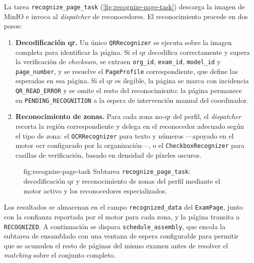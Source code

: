 La tarea \texttt{recognize\_page\_task} (\cref{fig:recognize-page-task})
descarga la imagen de MinIO e invoca al \textit{dispatcher} de
reconocedores. El reconocimiento procede en dos pasos:

\begin{enumerate}
  \item \textbf{Decodificación \acs{qr}.} Un único \texttt{QRRecognizer}
  se ejecuta sobre la imagen completa para identificar la página. Si el
  \acs{qr} decodifica correctamente y supera la verificación de
  \textit{checksum}, se extraen \texttt{org\_id}, \texttt{exam\_id},
  \texttt{model\_id} y \texttt{page\_number}, y se resuelve el
  \texttt{PageProfile} correspondiente, que define las
   esperadas en esa página. Si el \acs{qr} es ilegible, la
  página se marca con incidencia \texttt{QR\_READ\_ERROR} y se omite el
  resto del reconocimiento: la página permanece en
  \texttt{PENDING\_RECOGNITION} a la espera de intervención manual del
  coordinador.

  \item \textbf{Reconocimiento de zonas.} Para cada zona no-\acs{qr} del
  perfil, el \textit{dispatcher} recorta la región correspondiente y
  delega en el reconocedor adecuado según el tipo de zona: el
  \texttt{OCRRecognizer} para texto y números —apoyado en el motor
  \acs{ocr}  configurado por la organización—, o el
  \texttt{CheckboxRecognizer} para casillas de verificación, basado en
  densidad de píxeles oscuros.
\end{enumerate}

\begin{figure}[Subtarea de reconocimiento]%
              {fig:recognize-page-task}%
              {Subtarea \texttt{recognize\_page\_task}: decodificación
               \acs{qr} y reconocimiento de zonas del perfil mediante el
               motor activo y los reconocedores especializados.}
\end{figure}

Los resultados se almacenan en el campo \texttt{recognized\_data} del
\texttt{ExamPage}, junto con la confianza reportada por el motor para
cada zona, y la página transita a \texttt{RECOGNIZED}. A continuación se
dispara \texttt{schedule\_assembly}, que encola la subtarea de
ensamblado con una ventana de espera configurable para permitir que se
acumulen el resto de páginas del mismo examen antes de resolver el
\textit{matching} sobre el conjunto completo.


